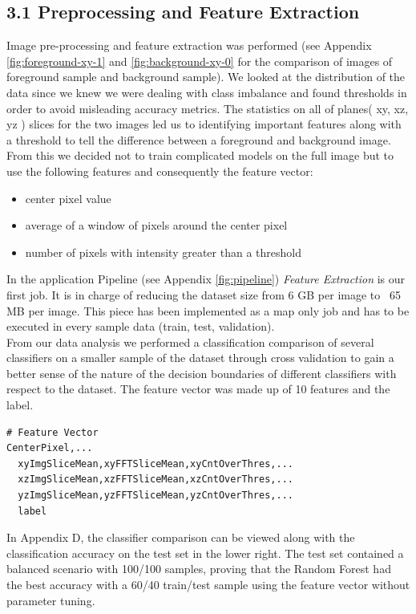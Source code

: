 \documentclass{neu_handout}
\begin{document}
\subsection*{3.1 Preprocessing and Feature Extraction}
Image pre-processing and feature extraction was performed (see Appendix \ref{fig:foreground-xy-1} and \ref{fig:background-xy-0} for the comparison of images of foreground sample and background sample). We looked at the distribution of the data since we knew we were dealing with class imbalance and found thresholds in order to avoid misleading accuracy metrics. The statistics on all of planes( xy, xz, yz ) slices for the two images led us to identifying important features along with a threshold to tell the difference between a foreground and background image. From this we decided not to train complicated models on the full image but to use the following features and consequently the feature vector:

\begin{itemize}
\setlength\itemsep{0.2em}
\item center pixel value
\item average of a window of pixels around the center pixel
\item number of pixels with intensity greater than a threshold
\end{itemize}

In the application Pipeline (see Appendix \ref{fig:pipeline}) \textit{Feature Extraction} is our first job. It is in charge of reducing the dataset size from 6 GB per image to ~65 MB per image. This piece has been implemented as a map only job and has to be executed in every sample data (train, test, validation). \\

From our data analysis we performed a classification comparison of several classifiers on a smaller sample of the dataset through cross validation to gain a better sense of the nature of the decision boundaries of different classifiers with respect to the dataset. The feature vector was made up of 10 features and the label.

\begin{lstlisting}
# Feature Vector
CenterPixel,...
  xyImgSliceMean,xyFFTSliceMean,xyCntOverThres,...
  xzImgSliceMean,xzFFTSliceMean,xzCntOverThres,...
  yzImgSliceMean,yzFFTSliceMean,yzCntOverThres,...
  label
\end{lstlisting}

In Appendix D, the classifier comparison can be viewed along with the classification accuracy on the test set in the lower right. The test set contained a balanced scenario with 100/100 samples, proving that the Random Forest had the best accuracy with a 60/40 train/test sample using the feature vector without parameter tuning.
\end{document}
